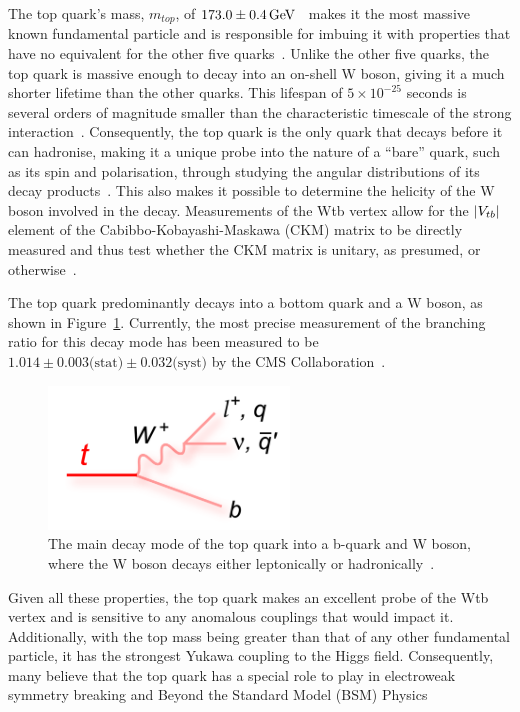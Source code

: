 The top quark's mass, $m_{top}$, of $173.0 \pm 0.4 \,\text{Ge\hspace{-.08em}V}$~\cite{Tanabashi:2018oca} makes it the most massive known fundamental particle and is responsible for imbuing it with properties that have no equivalent for the other five quarks~\cite{Tanabashi:2018oca}.
Unlike the other five quarks, the top quark is massive enough to decay into an on-shell W boson, giving it a much shorter lifetime than the other quarks.
This lifespan of $5 \times 10^{-25}$ seconds is several orders of magnitude smaller than the characteristic timescale of the strong interaction~\cite{Quadt}.
Consequently, the top quark is the only quark that decays before it can hadronise, making it a unique probe into the nature of a ``bare'' quark, such as its spin and polarisation, through studying the angular distributions of its decay products~\cite{Khachatryan:2015dzz}.
This also makes it possible to determine the helicity of the W boson involved in the decay.
Measurements of the Wtb vertex allow for the $\lvert V_{tb} \rvert$ element of the Cabibbo-Kobayashi-Maskawa (CKM) matrix to be directly measured and thus test whether the CKM matrix is unitary, as presumed, or otherwise~\cite{Shibata:2008sy}.

The top quark predominantly decays into a bottom quark and a W boson, as shown in Figure~\ref{fig:topDecay}.
Currently, the most precise measurement of the branching ratio for this decay mode has been measured to be $1.014 \pm 0.003 \textrm{(stat)} \pm 0.032 \textrm{(syst)}$ by the CMS Collaboration~\cite{Khachatryan:2014nda}.

\begin{figure}[htbp]
\begin{center}
\includegraphics[width=0.57\textwidth]{figs/top-physics/topDecay.png}
\caption{The main decay mode of the top quark into a b-quark and W boson, where the W boson decays either leptonically or hadronically~\cite{topDiagrams}.}
\label{fig:topDecay}
\end{center}
\end{figure}

Given all these properties, the top quark makes an excellent probe of the Wtb vertex and is sensitive to any anomalous couplings that would impact it.
Additionally, with the top mass being greater than that of any other fundamental particle, it has the strongest Yukawa coupling to the Higgs field.
Consequently, many believe that the top quark has a special role to play in electroweak symmetry breaking and Beyond the Standard Model (BSM) Physics~\cite{Giammanco:2017xyn}
 
